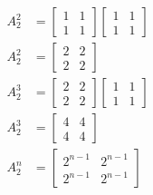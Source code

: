 \documentclass[main.tex]{subfiles}
\begin{document}
\begin{enumerate}
    $$
    \begin{aligned}
    A_{2}^{2} &= \left[\begin{array}{ll}
    1 & 1 \\
    1 & 1
    \end{array}\right]\left[\begin{array}{ll}
    1 & 1 \\
    1 & 1
    \end{array}\right] \\
    A_{2}^{2} &= \left[\begin{array}{ll}
    2 & 2 \\
    2 & 2
    \end{array}\right]\\
    A_{2}^{3} &= \left[\begin{array}{ll}
    2 & 2 \\
    2 & 2
    \end{array}\right]\left[\begin{array}{ll}
    1 & 1 \\
    1 & 1
    \end{array}\right] \\
    A_{2}^{3} &= \left[\begin{array}{ll}
    4 & 4 \\
    4 & 4
    \end{array}\right] \\
    A_{2}^{n} &= \left[\begin{array}{ll}
    2^{n-1} & 2^{n-1} \\
    2^{n-1} & 2^{n-1}
    \end{array}\right]
    \end{aligned}
    $$
    

\end{enumerate}
\end{document}

